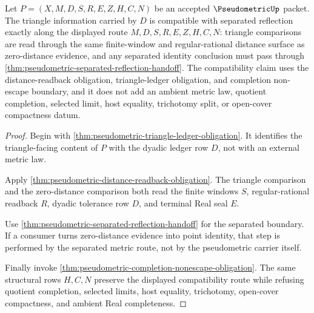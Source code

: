 \begin{theorem}
\label{thm:pseudometric-triangle-separated-reflection-compatibility}
Let $P=(X,M,D,S,R,E,Z,H,C,N)$ be an accepted $\PseudometricUp$ packet. The triangle information carried by $D$ is compatible with separated reflection exactly along the displayed route $M,D,S,R,E,Z,H,C,N$: triangle comparisons are read through the same finite-window and regular-rational distance surface as zero-distance evidence, and any separated identity conclusion must pass through \autoref{thm:pseudometric-separated-reflection-handoff}. The compatibility claim uses the distance-readback obligation, triangle-ledger obligation, and completion non-escape boundary, and it does not add an ambient metric law, quotient completion, selected limit, host equality, trichotomy split, or open-cover compactness datum.
\end{theorem}
\begin{proof}
Begin with \autoref{thm:pseudometric-triangle-ledger-obligation}. It identifies the triangle-facing content of $P$ with the dyadic ledger row $D$, not with an external metric law.

Apply \autoref{thm:pseudometric-distance-readback-obligation}. The triangle comparison and the zero-distance comparison both read the finite windows $S$, regular-rational readback $R$, dyadic tolerance row $D$, and terminal Real seal $E$.

Use \autoref{thm:pseudometric-separated-reflection-handoff} for the separated boundary. If a consumer turns zero-distance evidence into point identity, that step is performed by the separated metric route, not by the pseudometric carrier itself.

Finally invoke \autoref{thm:pseudometric-completion-nonescape-obligation}. The same structural rows $H,C,N$ preserve the displayed compatibility route while refusing quotient completion, selected limits, host equality, trichotomy, open-cover compactness, and ambient Real completeness.
\end{proof}

